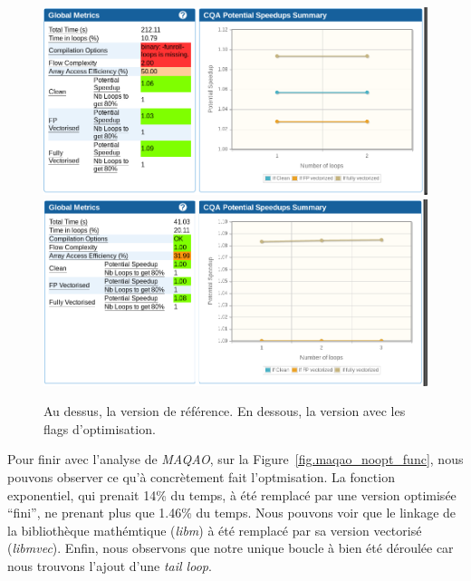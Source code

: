 \documentclass[12pt,a4paper]{article}
\begin{document}
\begin{figure}[h]
    \centering
    \includegraphics[scale=0.5]{./figures/L1/maqao_noopt_ref_global.png}
    \includegraphics[scale=0.5]{./figures/L1/maqao_noopt_opt_global.png}
    \caption{Au dessus, la version de référence. En dessous, la version avec les
    flags d'optimisation.}
    \label{fig.maqao_noopt_global}
\end{figure}

Pour finir avec l'analyse de \textit{MAQAO}, sur la
Figure~\ref{fig.maqao_noopt_func}, nous pouvons observer ce qu'à concrètement
fait l'optmisation. La fonction exponentiel, qui prenait 14\% du temps, à été
remplacé par une version optimisée \enquote{fini}, ne prenant plus que 1.46\% du
temps. Nous pouvons voir que le linkage de la bibliothèque mathémtique
(\textit{libm}) à été remplacé par sa version vectorisé (\textit{libmvec}).
Enfin, nous observons que notre unique boucle à bien été déroulée car nous
trouvons l'ajout d'une \textit{tail loop}.
\end{document}
